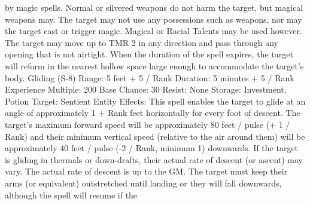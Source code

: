 \documentclass[a4paper]{article}
\begin{document}
\begin{multicols}{3}
by magic spells. Normal or silvered weapons do
not harm the target, but magical weapons may. The
target may not use any possessions such as weapons, nor may the target cast or trigger magic.
Magical or Racial Talents may be used however.
The target may move up to TMR 2 in any direction
and pass through any opening that is not airtight.
When the duration of the spell expires, the target
will reform in the nearest hollow space large
enough to accommodate the target’s body.
Gliding (S-8)
Range: 5 feet + 5 / Rank
Duration: 5 minutes + 5 / Rank
Experience Multiple: 200
Base Chance: 30%
Resist: None
Storage: Investment, Potion
Target: Sentient Entity
Effects: This spell enables the target to glide at an
angle of approximately 1 + Rank feet horizontally
for every foot of descent. The target’s maximum
forward speed will be approximately 80 feet / pulse
(+ 1 / Rank) and their minimum vertical speed
(relative to the air around them) will be approximately 40 feet / pulse (-2 / Rank, minimum 1)
downwards. If the target is gliding in thermals or
down-drafts, their actual rate of descent (or ascent)
may vary. The actual rate of descent is up to the
GM. The target must keep their arms (or equivalent) outstretched until landing or they will fall
downwards, although the spell will resume if the


\end{multicols}
\end{document}
